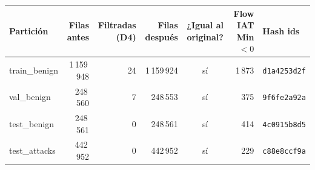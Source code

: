 \begin{tabular}{@{}lrrrcrl@{}}
\toprule
Partición & Filas antes & Filtradas (D4) & Filas después & ¿Igual al original? & Flow IAT Min $<0$ & Hash ids \\
\midrule
train\_benign & 1\,159\,948 & 24 & 1\,159\,924 & sí & 1\,873 & \texttt{d1a4253d2f} \\
val\_benign & 248\,560 & 7 & 248\,553 & sí & 375 & \texttt{9f6fe2a92a} \\
test\_benign & 248\,561 & 0 & 248\,561 & sí & 414 & \texttt{4c0915b8d5} \\
test\_attacks & 442\,952 & 0 & 442\,952 & sí & 229 & \texttt{c88e8ccf9a} \\
\bottomrule
\end{tabular}
